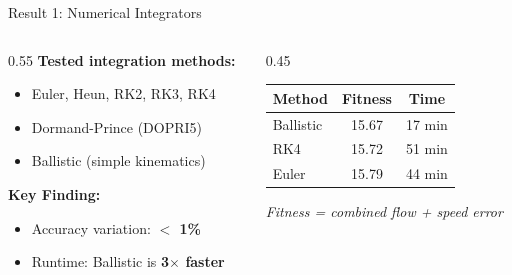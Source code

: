 \documentclass[aspectratio=169]{beamer}
\begin{document}
    \begin{frame}{Result 1: Numerical Integrators}
        \begin{columns}
            \begin{column}{0.55\textwidth}
                \textbf{Tested integration methods:}
                \begin{itemize}
                    \item Euler, Heun, RK2, RK3, RK4
                    \item Dormand-Prince (DOPRI5)
                    \item Ballistic (simple kinematics)
                \end{itemize}

                \vspace{1em}
                \textbf{Key Finding:}
                \begin{itemize}
                    \item Accuracy variation: \textbf{$<$ 1\%}
                    \item Runtime: Ballistic is \textbf{3$\times$ faster}
                \end{itemize}

                \vspace{1em}
            \end{column}
            \begin{column}{0.45\textwidth}
                \centering
                \small
                \begin{tabular}{lcc}
                    \toprule
                    \textbf{Method} & \textbf{Fitness} & \textbf{Time} \\
                    \midrule
                    Ballistic & 15.67 & 17 min \\
                    RK4 & 15.72 & 51 min \\
                    Euler & 15.79 & 44 min \\
                    \bottomrule
                \end{tabular}
                \vspace{1em}

                \textit{Fitness = combined flow + speed error}
            \end{column}
        \end{columns}
    \end{frame}
\end{document}
